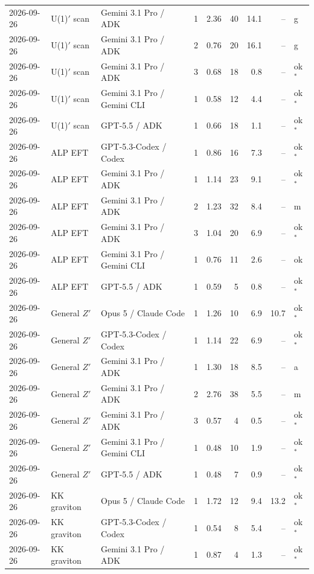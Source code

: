 \begin{longtable}{llllrrrrl}
2026-09-26 & U(1)$'$ scan & Gemini 3.1 Pro / ADK & 1 & 2.36 & 40 & 14.1 & -- & g \\
2026-09-26 & U(1)$'$ scan & Gemini 3.1 Pro / ADK & 2 & 0.76 & 20 & 16.1 & -- & g \\
2026-09-26 & U(1)$'$ scan & Gemini 3.1 Pro / ADK & 3 & 0.68 & 18 & 0.8 & -- & ok$^{*}$ \\
2026-09-26 & U(1)$'$ scan & Gemini 3.1 Pro / Gemini CLI & 1 & 0.58 & 12 & 4.4 & -- & ok$^{*}$ \\
2026-09-26 & U(1)$'$ scan & GPT-5.5 / ADK & 1 & 0.66 & 18 & 1.1 & -- & ok$^{*}$ \\
2026-09-26 & ALP EFT & GPT-5.3-Codex / Codex & 1 & 0.86 & 16 & 7.3 & -- & ok$^{*}$ \\
2026-09-26 & ALP EFT & Gemini 3.1 Pro / ADK & 1 & 1.14 & 23 & 9.1 & -- & ok$^{*}$ \\
2026-09-26 & ALP EFT & Gemini 3.1 Pro / ADK & 2 & 1.23 & 32 & 8.4 & -- & m \\
2026-09-26 & ALP EFT & Gemini 3.1 Pro / ADK & 3 & 1.04 & 20 & 6.9 & -- & ok$^{*}$ \\
2026-09-26 & ALP EFT & Gemini 3.1 Pro / Gemini CLI & 1 & 0.76 & 11 & 2.6 & -- & ok \\
2026-09-26 & ALP EFT & GPT-5.5 / ADK & 1 & 0.59 & 5 & 0.8 & -- & ok$^{*}$ \\
2026-09-26 & General $Z'$ & Opus 5 / Claude Code & 1 & 1.26 & 10 & 6.9 & 10.7 & ok$^{*}$ \\
2026-09-26 & General $Z'$ & GPT-5.3-Codex / Codex & 1 & 1.14 & 22 & 6.9 & -- & ok$^{*}$ \\
2026-09-26 & General $Z'$ & Gemini 3.1 Pro / ADK & 1 & 1.30 & 18 & 8.5 & -- & a \\
2026-09-26 & General $Z'$ & Gemini 3.1 Pro / ADK & 2 & 2.76 & 38 & 5.5 & -- & m \\
2026-09-26 & General $Z'$ & Gemini 3.1 Pro / ADK & 3 & 0.57 & 4 & 0.5 & -- & ok$^{*}$ \\
2026-09-26 & General $Z'$ & Gemini 3.1 Pro / Gemini CLI & 1 & 0.48 & 10 & 1.9 & -- & ok$^{*}$ \\
2026-09-26 & General $Z'$ & GPT-5.5 / ADK & 1 & 0.48 & 7 & 0.9 & -- & ok$^{*}$ \\
2026-09-26 & KK graviton & Opus 5 / Claude Code & 1 & 1.72 & 12 & 9.4 & 13.2 & ok$^{*}$ \\
2026-09-26 & KK graviton & GPT-5.3-Codex / Codex & 1 & 0.54 & 8 & 5.4 & -- & ok$^{*}$ \\
2026-09-26 & KK graviton & Gemini 3.1 Pro / ADK & 1 & 0.87 & 4 & 1.3 & -- & ok$^{*}$ \\

\end{longtable}
